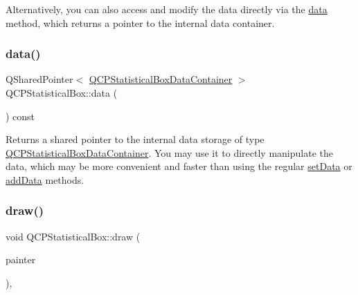 Alternatively, you can also access and modify the data directly via the \hyperlink{class_q_c_p_statistical_box_a728e501413eaf191544014173d52dfbc}{data} method, which returns a pointer to the internal data container. \mbox{\label{class_q_c_p_statistical_box_a728e501413eaf191544014173d52dfbc}} 
\subsubsection{\texorpdfstring{data()}{data()}}
{\footnotesize\ttfamily Q\+Shared\+Pointer$<$ \hyperlink{qcustomplot_8h_a8b773c0c35f8f924701ced6e9915e4c7}{Q\+C\+P\+Statistical\+Box\+Data\+Container} $>$ Q\+C\+P\+Statistical\+Box\+::data (\begin{DoxyParamCaption}{ }\end{DoxyParamCaption}) const\hspace{0.3cm}{\ttfamily [inline]}}

Returns a shared pointer to the internal data storage of type \hyperlink{qcustomplot_8h_a8b773c0c35f8f924701ced6e9915e4c7}{Q\+C\+P\+Statistical\+Box\+Data\+Container}. You may use it to directly manipulate the data, which may be more convenient and faster than using the regular \hyperlink{class_q_c_p_statistical_box_a08a6da55822bad825ee25a8069b9b52f}{set\+Data} or \hyperlink{class_q_c_p_statistical_box_a9a8739c5b8291db8fd839e892fc8f478}{add\+Data} methods. \mbox{\label{class_q_c_p_statistical_box_afcff35fa79728cfe10e80e0702014fea}} 
\subsubsection{\texorpdfstring{draw()}{draw()}}
{\footnotesize\ttfamily void Q\+C\+P\+Statistical\+Box\+::draw (\begin{DoxyParamCaption}\item[{\hyperlink{class_q_c_p_painter}{Q\+C\+P\+Painter} $\ast$}]{painter }\end{DoxyParamCaption})\hspace{0.3cm}{\ttfamily [protected]}, {\ttfamily [virtual]}}



